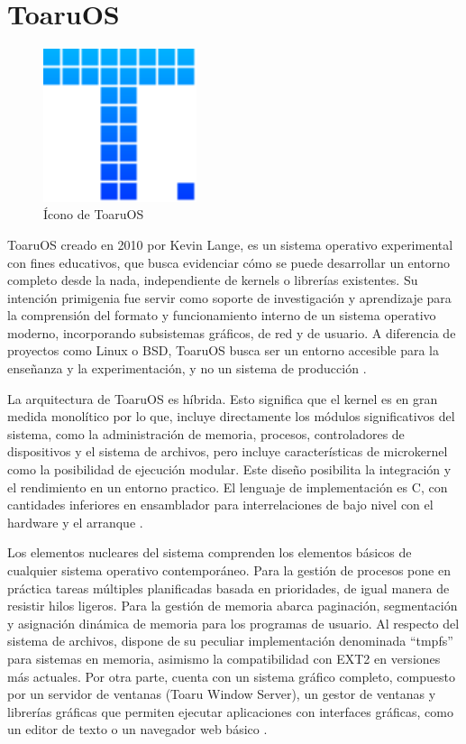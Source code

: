 \section{ToaruOS}

\begin{figure}[H]
    \centering
    \includegraphics[width=0.4\textwidth]{figures/logoToaruOS.png}
    \caption[Ícono de ToaruOS]
            {Ícono de ToaruOS \citep{toaruoslogo2025}}
    \label{fig:ToaruOS}
\end{figure}

ToaruOS creado en 2010 por Kevin Lange, es un sistema operativo experimental con fines educativos, que busca evidenciar cómo se puede desarrollar un entorno completo desde la nada, independiente de kernels o librerías existentes. Su intención primigenia fue servir como soporte de investigación y aprendizaje para la comprensión del formato y funcionamiento interno de un sistema operativo moderno, incorporando subsistemas gráficos, de red y de usuario. A diferencia de proyectos como Linux o BSD, ToaruOS busca ser un entorno accesible para la enseñanza y la experimentación, y no un sistema de producción \citep{toaruos2025}.

La arquitectura de ToaruOS es híbrida. Esto significa que el kernel es en gran medida monolítico por lo que, incluye directamente los módulos significativos del sistema, como la administración de memoria, procesos, controladores de dispositivos y el sistema de archivos, pero incluye características de microkernel como la posibilidad de ejecución modular. Este diseño posibilita la integración y el rendimiento en un entorno practico. El lenguaje de implementación es C, con cantidades inferiores en ensamblador para interrelaciones de bajo nivel con el hardware y el arranque \citep{toaruos2025}.

Los elementos nucleares del sistema comprenden los elementos básicos de cualquier sistema operativo contemporáneo. Para la gestión de procesos pone en práctica tareas múltiples planificadas basada en prioridades, de igual manera de resistir hilos ligeros. Para la gestión de memoria abarca paginación, segmentación y asignación dinámica de memoria para los programas de usuario. Al respecto del sistema de archivos, dispone de su peculiar implementación denominada “tmpfs” para sistemas en memoria, asimismo la compatibilidad con EXT2 en versiones más actuales. Por otra parte, cuenta con un sistema gráfico completo, compuesto por un servidor de ventanas (Toaru Window Server), un gestor de ventanas y librerías gráficas que permiten ejecutar aplicaciones con interfaces gráficas, como un editor de texto o un navegador web básico \citep{toaruos2025}.


